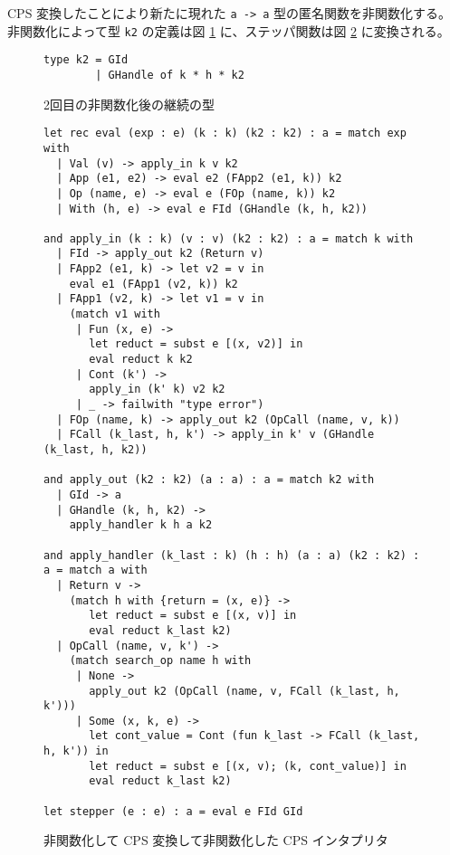 CPS 変換したことにより新たに現れた \texttt{a -> a} 型の匿名関数を非関数化する。非関数化によって型 \texttt{k2} の定義は図 \ref{figure:k2_4defun} に、ステッパ関数は図 \ref{figure:4defun} に変換される。

\begin{figure}
\begin{verbatim}
type k2 = GId
        | GHandle of k * h * k2
\end{verbatim}
\caption{2回目の非関数化後の継続の型}
\label{figure:k2_4defun}
\end{figure}

\begin{figure}
\begin{verbatim}
let rec eval (exp : e) (k : k) (k2 : k2) : a = match exp with
  | Val (v) -> apply_in k v k2
  | App (e1, e2) -> eval e2 (FApp2 (e1, k)) k2
  | Op (name, e) -> eval e (FOp (name, k)) k2
  | With (h, e) -> eval e FId (GHandle (k, h, k2))

and apply_in (k : k) (v : v) (k2 : k2) : a = match k with
  | FId -> apply_out k2 (Return v)
  | FApp2 (e1, k) -> let v2 = v in
    eval e1 (FApp1 (v2, k)) k2
  | FApp1 (v2, k) -> let v1 = v in
    (match v1 with
     | Fun (x, e) ->
       let reduct = subst e [(x, v2)] in
       eval reduct k k2
     | Cont (k') ->
       apply_in (k' k) v2 k2
     | _ -> failwith "type error")
  | FOp (name, k) -> apply_out k2 (OpCall (name, v, k))
  | FCall (k_last, h, k') -> apply_in k' v (GHandle (k_last, h, k2))

and apply_out (k2 : k2) (a : a) : a = match k2 with
  | GId -> a
  | GHandle (k, h, k2) ->
    apply_handler k h a k2

and apply_handler (k_last : k) (h : h) (a : a) (k2 : k2) : a = match a with
  | Return v ->
    (match h with {return = (x, e)} ->
       let reduct = subst e [(x, v)] in
       eval reduct k_last k2)
  | OpCall (name, v, k') ->
    (match search_op name h with
     | None ->
       apply_out k2 (OpCall (name, v, FCall (k_last, h, k')))
     | Some (x, k, e) ->
       let cont_value = Cont (fun k_last -> FCall (k_last, h, k')) in
       let reduct = subst e [(x, v); (k, cont_value)] in
       eval reduct k_last k2)

let stepper (e : e) : a = eval e FId GId
\end{verbatim}
\caption{非関数化して CPS 変換して非関数化した CPS インタプリタ}
\label{figure:4defun}
\end{figure}


